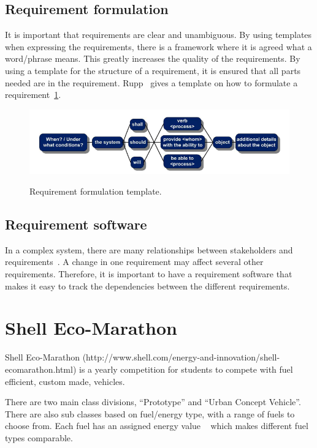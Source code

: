 \subsection{Requirement formulation}
It is important that requirements are clear and unambiguous. By using templates
when expressing the requirements, there is a framework where it is agreed what a
word/phrase means. This greatly increases the quality of the requirements\cite{rupp2014}. 
By using a template for the structure of a requirement, it is
ensured that all parts needed are in the requirement. Rupp~\cite{rupp2014}
gives a template on how to formulate a requirement~\ref{fig:req_template}.
\begin{figure}[H]
    \centering
    \includegraphics[width=\textwidth]{./img/introduction_req_template.PNG}\label{fig:req_template}
    \caption{Requirement formulation template.}
\end{figure}
\subsection{Requirement software}
In a complex system, there are many relationships between stakeholders and
requirements~\cite{ibm_req}. A change in one requirement may affect several other
requirements. Therefore, it is important to have a requirement software that
makes it easy to track the dependencies between the different requirements.

\section{Shell Eco-Marathon}
Shell Eco-Marathon (http://www.shell.com/energy-and-innovation/shell-ecomarathon.html) is a yearly competition for students to compete with fuel efficient, custom made, vehicles.

There are two main class divisions, ``Prototype'' and ``Urban Concept
Vehicle''. There are also sub classes based on fuel/energy type, with a range
of fuels to choose from. Each fuel has an assigned energy value ~\cite{semrules16c1} which makes different fuel types comparable. 

